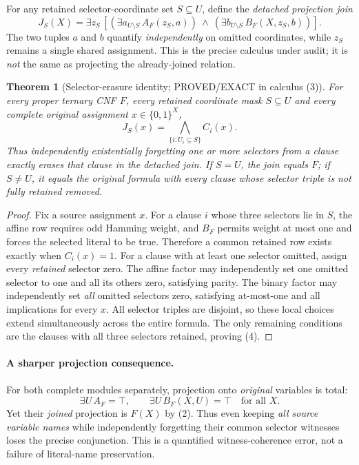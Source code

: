 \documentclass[11pt]{article}
\newtheorem{theorem}{Theorem}
\begin{document}
For any retained selector-coordinate set $S\subseteq U$, define the \emph{detached projection join}
\[
 J_S(X)=\exists z_S\,\left[
  (\exists a_{U\setminus S}\, A_F(z_S,a))\ \wedge\
  (\exists b_{U\setminus S}\, B_F(X,z_S,b))
 \right].
 \tag{3}
\]
The two tuples $a$ and $b$ quantify \emph{independently} on omitted coordinates, while $z_S$ remains a single shared assignment. This is the precise calculus under audit; it is \emph{not} the same as projecting the already-joined relation.

\begin{theorem}[Selector-erasure identity; PROVED/EXACT in calculus (3)]
For \emph{every} proper ternary CNF $F$, every retained coordinate mask $S\subseteq U$ and every complete original assignment $x\in\{0,1\}^{X}$,
\[
 \boxed{
 J_S(x)=\bigwedge_{\{i:U_i\subseteq S\}} C_i(x).
 }
 \tag{4}
\]
Thus independently existentially forgetting \emph{one or more} selectors from a clause exactly erases that clause in the detached join. If $S=U$, the join equals $F$; if $S\ne U$, it equals the original formula with every clause whose selector triple is not fully retained removed.
\end{theorem}
\begin{proof}
Fix a source assignment $x$. For a clause $i$ whose three selectors lie in $S$, the affine row requires odd Hamming weight, and $B_F$ permits weight at most one and forces the selected literal to be true. Therefore a common retained row exists exactly when $C_i(x)=1$.
For a clause with at least one selector omitted, assign every \emph{retained} selector zero. The affine factor may independently set one omitted selector to one and all its others zero, satisfying parity. The binary factor may independently set \emph{all} omitted selectors zero, satisfying at-most-one and all implications for every $x$. All selector triples are disjoint, so these local choices extend simultaneously across the entire formula. The only remaining conditions are the clauses with all three selectors retained, proving (4).
\end{proof}

\paragraph{A sharper projection consequence.}
For both complete modules separately, projection onto \emph{original} variables is total:
\[
 \exists U\,A_F=\top,\qquad \exists U\,B_F(X,U)=\top
 \quad\text{for all }X.
\]
Yet their \emph{joined} projection is $F(X)$ by (2).
Thus even keeping \emph{all source variable names} while independently forgetting their common selector witnesses loses the precise conjunction. This is a quantified witness-coherence error, not a failure of literal-name preservation.
\end{document}
